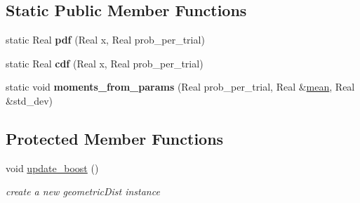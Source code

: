\subsection*{Static Public Member Functions}
\begin{DoxyCompactItemize}
\item 
static Real {\bfseries pdf} (Real x, Real prob\+\_\+per\+\_\+trial)\label{classPecos_1_1GeometricRandomVariable_af19596bc5d4af3dff550b05920ed1fdd}

\item 
static Real {\bfseries cdf} (Real x, Real prob\+\_\+per\+\_\+trial)\label{classPecos_1_1GeometricRandomVariable_a501fe299ab60ca83642d33ff53cefc03}

\item 
static void {\bfseries moments\+\_\+from\+\_\+params} (Real prob\+\_\+per\+\_\+trial, Real \&\hyperlink{classPecos_1_1GeometricRandomVariable_a962ffe5a3593be370d5c883365c060f4}{mean}, Real \&std\+\_\+dev)\label{classPecos_1_1GeometricRandomVariable_a88140ecd8934bf4807efbd1cab8958ee}

\end{DoxyCompactItemize}
\subsection*{Protected Member Functions}
\begin{DoxyCompactItemize}
\item 
void \hyperlink{classPecos_1_1GeometricRandomVariable_aaa6750cbee2245416a6eeeac58d4405a}{update\+\_\+boost} ()\label{classPecos_1_1GeometricRandomVariable_aaa6750cbee2245416a6eeeac58d4405a}

\begin{DoxyCompactList}\small\item\em create a new geometric\+Dist instance \end{DoxyCompactList}\end{DoxyCompactItemize}
